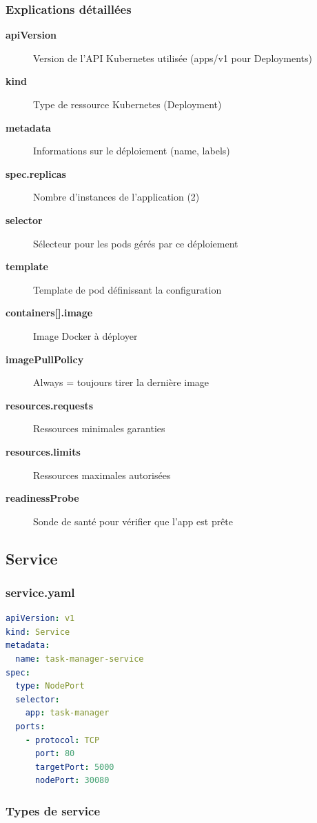 \documentclass[12pt,a4paper,twoside]{report}
\begin{document}
\subsubsection{Explications détaillées}

\begin{description}
    \item[\textbf{apiVersion}] Version de l'API Kubernetes utilisée (apps/v1 pour Deployments)
    \item[\textbf{kind}] Type de ressource Kubernetes (Deployment)
    \item[\textbf{metadata}] Informations sur le déploiement (name, labels)
    \item[\textbf{spec.replicas}] Nombre d'instances de l'application (2)
    \item[\textbf{selector}] Sélecteur pour les pods gérés par ce déploiement
    \item[\textbf{template}] Template de pod définissant la configuration
    \item[\textbf{containers[].image}] Image Docker à déployer
    \item[\textbf{imagePullPolicy}] Always = toujours tirer la dernière image
    \item[\textbf{resources.requests}] Ressources minimales garanties
    \item[\textbf{resources.limits}] Ressources maximales autorisées
    \item[\textbf{readinessProbe}] Sonde de santé pour vérifier que l'app est prête
\end{description}

\subsection{Service}

\subsubsection{service.yaml}

\begin{lstlisting}[language=yaml]
apiVersion: v1
kind: Service
metadata:
  name: task-manager-service
spec:
  type: NodePort
  selector:
    app: task-manager
  ports:
    - protocol: TCP
      port: 80
      targetPort: 5000
      nodePort: 30080
\end{lstlisting}

\subsubsection{Types de service}
\end{document}
